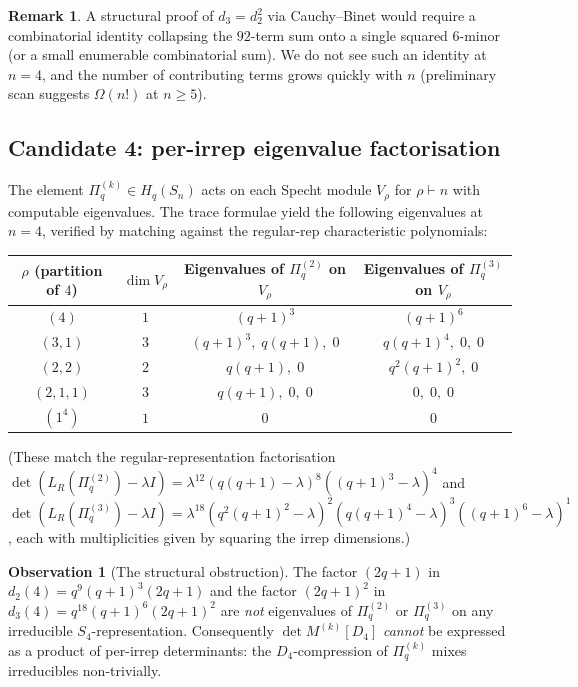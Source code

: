 \documentclass[11pt]{article}
\theoremstyle{definition}
\newtheorem{remark}[theorem]{Remark}
\newtheorem{observation}[theorem]{Observation}
\begin{document}
\begin{remark}
A structural proof of $d_3 = d_2^2$ via Cauchy--Binet would require a
combinatorial identity collapsing the $92$-term sum onto a single squared
$6$-minor (or a small enumerable combinatorial sum). We do not see such an
identity at $n=4$, and the number of contributing terms grows quickly with
$n$ (preliminary scan suggests $\Omega(n!)$ at $n \geq 5$).
\end{remark}

\subsection{Candidate 4: per-irrep eigenvalue factorisation}

The element $\Pi^{(k)}_q \in H_q(S_n)$ acts on each Specht module $V_\rho$ for
$\rho \vdash n$ with computable eigenvalues. The trace formulae yield the
following eigenvalues at $n=4$, verified by matching against the regular-rep
characteristic polynomials:

\begin{center}
\begin{tabular}{|c|c|c|c|}
\hline
$\rho$ (partition of $4$) & $\dim V_\rho$ & Eigenvalues of $\Pi^{(2)}_q$ on $V_\rho$ & Eigenvalues of $\Pi^{(3)}_q$ on $V_\rho$ \\
\hline
$(4)$ & $1$ & $(q+1)^3$ & $(q+1)^6$ \\
$(3,1)$ & $3$ & $(q+1)^3,\; q(q+1),\; 0$ & $q(q+1)^4,\; 0,\; 0$ \\
$(2,2)$ & $2$ & $q(q+1),\; 0$ & $q^2(q+1)^2,\; 0$ \\
$(2,1,1)$ & $3$ & $q(q+1),\; 0,\; 0$ & $0,\; 0,\; 0$ \\
$(1^4)$ & $1$ & $0$ & $0$ \\
\hline
\end{tabular}
\end{center}

(These match the regular-representation factorisation
$\det(L_R(\Pi^{(2)}_q) - \lambda I) = \lambda^{12}(q(q+1) - \lambda)^8((q+1)^3 - \lambda)^4$
and
$\det(L_R(\Pi^{(3)}_q) - \lambda I) = \lambda^{18}(q^2(q+1)^2 - \lambda)^2(q(q+1)^4 - \lambda)^3((q+1)^6 - \lambda)^1$,
each with multiplicities given by squaring the irrep dimensions.)

\begin{observation}[The structural obstruction]\label{obs:obstr}
The factor $(2q+1)$ in $d_2(4) = q^9(q+1)^3(2q+1)$ and the factor $(2q+1)^2$ in
$d_3(4) = q^{18}(q+1)^6(2q+1)^2$ are \emph{not} eigenvalues of $\Pi^{(2)}_q$ or
$\Pi^{(3)}_q$ on any irreducible $S_4$-representation. Consequently
$\det M^{(k)}[D_4]$ \emph{cannot} be expressed as a product of per-irrep
determinants: the $D_4$-compression of $\Pi^{(k)}_q$ mixes irreducibles
non-trivially.
\end{observation}
\end{document}
